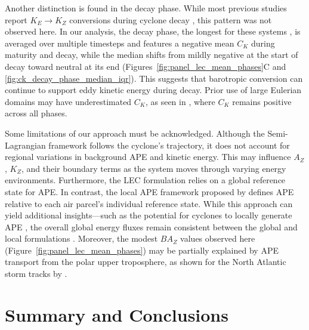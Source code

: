 \documentclass[pdflatex,sn-chicago]{sn-jnl}%
\theoremstyle{plain}
\theoremstyle{definition}
\theoremstyle{remark}
\theoremstyle{definition}
\begin{document}
Another distinction is found in the decay phase. While most previous studies report $K_E \rightarrow K_Z$ conversions during cyclone decay \citep[e.g.,][]{dias2011energy,veiga2008analysis,pezza2014large}, this pattern was not observed here. In our analysis, the decay phase, the longest for these systems \citep{couto2024new}, is averaged over multiple timesteps and features a negative mean $C_K$ during maturity and decay, while the median shifts from mildly negative at the start of decay toward neutral at its end (Figures~\ref{fig:panel_lec_mean_phases}C and \ref{fig:ck_decay_phase_median_iqr}). This suggests that barotropic conversion can continue to support eddy kinetic energy during decay. Prior use of large Eulerian domains may have underestimated $C_K$, as seen in \citet{black2013universal}, where $C_K$ remains positive across all phases.

Some limitations of our approach must be acknowledged. Although the Semi-Lagrangian framework follows the cyclone's trajectory, it does not account for regional variations in background APE and kinetic energy. This may influence $A_Z$, $K_Z$, and their boundary terms as the system moves through varying energy environments. Furthermore, the LEC formulation relies on a global reference state for APE. In contrast, the local APE framework proposed by \citet{novak2018local} defines APE relative to each air parcel’s individual reference state. While this approach can yield additional insights—such as the potential for cyclones to locally generate APE \citep{federer2024local}, the overall global energy fluxes remain consistent between the global and local formulations \citep{liu2024systematic}. Moreover, the modest $BA_Z$ values observed here (Figure~\ref{fig:panel_lec_mean_phases}) may be partially explained by APE transport from the polar upper troposphere, as shown for the North Atlantic storm tracks by \citet{federer2025synoptic}.

\section{Summary and Conclusions}\label{sec:conclusion}
\end{document}
